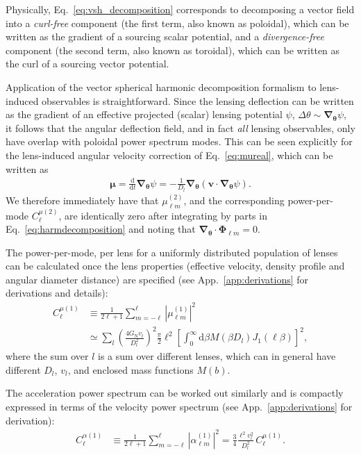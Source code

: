 \documentclass[prd,aps,10pt,nofootinbib,twocolumn,superscriptaddress,preprintnumbers,balancelastpage,longbibliography]{revtex4-1}
\newcommand{\vect}[1]{\boldsymbol{\mathbf{#1}}}
\newcommand{\dd}{\mathrm{d}}
\newcommand{\GN}{G_\mathrm{N}}
\newcommand{\blue}[1]{\textcolor{deepblue}{\bf #1}}
\begin{document}
Physically, Eq.~\ref{eq:vsh_decomposition} corresponds to decomposing a vector field into a \emph{curl-free} component (the first term, also known as poloidal), which can be written as the gradient of a sourcing scalar potential, and a \emph{divergence-free} component (the second term, also known as toroidal), which can be written as the curl of a sourcing vector potential. 

Application of the vector spherical harmonic decomposition formalism to lens-induced observables is straightforward. Since the lensing deflection can be written as the gradient of an effective projected (scalar) lensing potential $\psi$, $\Delta\theta \sim \vect{\nabla}_{\vect{\theta}} \psi$, it follows that the angular deflection field, and in fact \emph{all} lensing observables, only have overlap with poloidal power spectrum modes. This can be seen explicitly for the lens-induced angular velocity correction of Eq.~\ref{eq:mureal}, which can be written as
\begin{align}
 \vect{\mu} =  \frac{\dd}{\dd t} \vect{\nabla}_{\vect{\theta}} \psi = - \frac{1}{D_l} \vect{\nabla}_{\vect{\theta}} \left(\vect{v} \cdot \vect{\nabla}_{\vect{\theta}} \psi \right) \label{eq:deflectionpotential}.
\end{align} 
We therefore immediately have that $\mu_{\ell m}^{(2)}$, and the corresponding power-per-mode $C_{\ell}^{\mu (2)}$, are identically zero after integrating by parts in Eq.~\ref{eq:harmdecomposition} and noting that $\vect{\nabla}_{\vect{\theta}} \cdot \vect{\Phi}_{\ell m} = 0$.

The power-per-mode, per lens for a uniformly distributed population of lenses can be calculated once the lens properties (effective velocity, density profile and angular diameter distance) are specified (see App.~\ref{app:derivations} for derivations and details):
\begin{align}
C_{\ell}^{\mu (1)} &\equiv \frac{1}{2\ell + 1} \sum_{m = -\ell}^{\ell} \left| \mu_{\ell m}^{(1)} \right|^2 \nonumber \\
&\simeq \sum_l \left(\frac{4 \GN v_l}{D_l^2}\right)^2 \frac{\pi}{2} \ell^2 \left[\int_0^\infty \dd \beta M(\beta D_l) J_1(\ell \beta) \right]^2, \label{eq:pspec_mu}
\end{align}
where the sum over $l$ is a sum over different lenses, which can in general have different $D_l$, $v_l$, and enclosed mass functions $M(b)$.

The acceleration power spectrum can be worked out similarly and is compactly expressed in terms of the velocity power spectrum (see App.~\ref{app:derivations} for derivation): 
\begin{align}
C_{\ell}^{\alpha (1)} &\equiv \frac{1}{2\ell + 1} \sum_{m = -\ell}^{\ell} \left| \alpha_{\ell m}^{(1)} \right|^2 = \frac{3}{4} \frac{\ell^2 v_l^2}{D_l^2}\,C_{\ell}^{\mu (1)}.
\label{eq:pspec_alpha}
\end{align}
\end{document}
